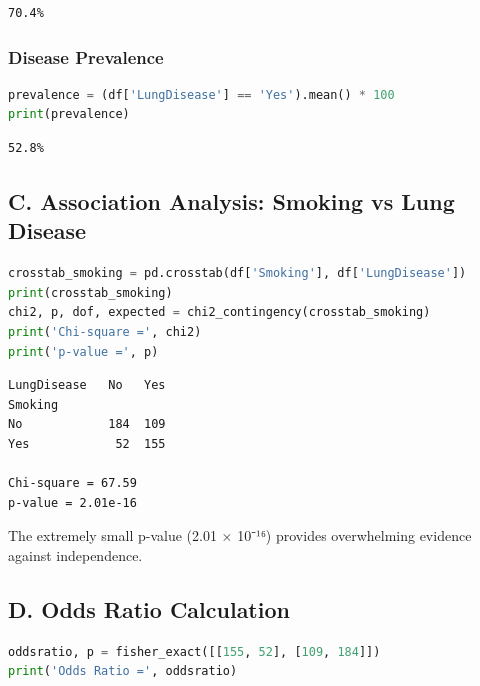 \documentclass[12pt, a4paper]{article}
\begin{document}
\begin{outputbox}
\begin{verbatim}
70.4%
\end{verbatim}
\end{outputbox}

\subsubsection*{Disease Prevalence}
\begin{lstlisting}[language=Python]
prevalence = (df['LungDisease'] == 'Yes').mean() * 100
print(prevalence)
\end{lstlisting}

\begin{outputbox}
\begin{verbatim}
52.8%
\end{verbatim}
\end{outputbox}

\subsection*{C. Association Analysis: Smoking vs Lung Disease}

\begin{lstlisting}[language=Python]
crosstab_smoking = pd.crosstab(df['Smoking'], df['LungDisease'])
print(crosstab_smoking)
chi2, p, dof, expected = chi2_contingency(crosstab_smoking)
print('Chi-square =', chi2)
print('p-value =', p)
\end{lstlisting}

\begin{outputbox}
\begin{verbatim}
LungDisease   No   Yes
Smoking
No            184  109
Yes            52  155

Chi-square = 67.59
p-value = 2.01e-16
\end{verbatim}
\end{outputbox}

\begin{statbox}
The extremely small p-value (2.01 × 10⁻¹⁶) provides overwhelming evidence against independence.
\end{statbox}

\subsection*{D. Odds Ratio Calculation}

\begin{lstlisting}[language=Python]
oddsratio, p = fisher_exact([[155, 52], [109, 184]])
print('Odds Ratio =', oddsratio)
\end{lstlisting}
\end{document}
